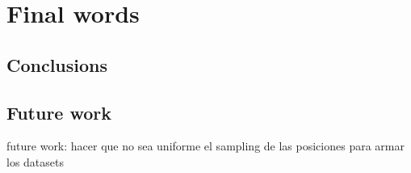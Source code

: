 \section{Final words}
\subsection{Conclusions}
\subsection{Future work}




future work: hacer que no sea uniforme el sampling de las posiciones para armar los datasets

